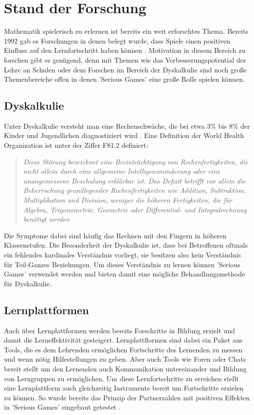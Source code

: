 
\chapter{Stand der Forschung}
Mathematik spielerisch zu erlernen ist bereits ein weit erforschtes Thema. Bereits 1992 gab es Forschungen in denen belegt wurde, dass Spiele einen positiven Einfluss auf den Lernfortschritt haben können \cite{?}. Motivation in diesem Bereich zu forschen gibt es genügend, denn mit Themen wie das Verbesserungspotential der Lehre an Schulen \cite{?} oder dem Forschen im Bereich der Dyskalkulie \cite{?} sind noch große Themenbereiche offen in denen 'Serious Games' eine große Rolle spielen können.
\section{Dyskalkulie}
Unter Dyskalkulie versteht man eine Rechenschwäche, die bei etwa 3\% bis 8\% der Kinder und Jugendlichen diagnostiziert wird \cite{BundesMinisteriumDia}. Eine Definition der World Health Organization ist unter der Ziffer F81.2 definiert:
\begin{quote}
\textit{ Diese Störung bezeichnet eine Beeinträchtigung von Rechenfertigkeiten, die nicht allein durch eine allgemeine Intelligenzminderung oder eine unangemessene Beschulung erklärbar ist. Das Defizit betrifft vor allem die Beherrschung grundlegender Rechenfertigkeiten wie Addition, Subtraktion, Multiplikation und Division, weniger die höheren Fertigkeiten, die für Algebra, Trigonometrie, Geometrie oder Differential- und Integralrechnung benötigt werden }
\end{quote}
Die Symptome dabei sind häufig das Rechnen mit den Fingern in höheren Klassenstufen. Die Besonderheit der Dyskalkulie ist, dass bei Betroffenen oftmals ein fehlendes kardinales Verständnis vorliegt\cite{fritz2009}, sie besitzen also kein Verständnis für Teil-Ganzes Beziehungen. Um dieses Verständnis zu lernen können 'Serious Games' verwendet werden\cite{bachelorarbeit} und bieten damit eine mögliche Behandlungsmethode für Dyskalkulie.
\section{Lernplattformen}
Auch über Lernplattformen werden bereits Forschritte in Bildung erzielt und damit die Lerneffektivität gesteigert. Lernplattflormen sind dabei ein Paket aus Tools, die es dem Lehrenden ermöglichen Fortschritte des Lernenden zu messen und wenn nötig Hilfestellungen zu geben. Aber auch Tools wie Foren oder Chats bereit stellt um den Lernenden auch Kommunikation untereinander und Bildung von Lerngruppen zu ermöglichen. Um diese Lernfortschritte zu erreichen stellt eine Lernplattform auch gleichzeitig Instrumente bereit um Fortschritte erzielen zu können. So wurde bereits das Prinzip der Partnerzahlen mit positiven Effekten in 'Serious Games' eingebaut getestet \cite{JUNG2015}.
